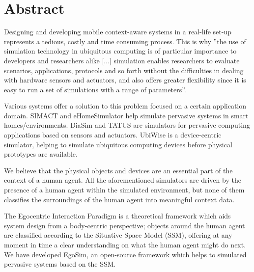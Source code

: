 \begingroup
\let\clearpage\relax
\let\cleardoublepage\relax
\let\cleardoublepage\relax

\chapter*{Abstract}
Designing and developing mobile context-aware systems in a real-life set-up represents a tedious, costly and time consuming process. This is why ''the use of simulation technology in ubiquitous computing is of particular importance to developers and researchers alike [...] simulation enables researchers to evaluate scenarios, applications, protocols and so forth without the difficulties in dealing with hardware sensors and actuators, and also offers greater flexibility since it is easy to run a set of simulations with a range of parameters''\cite{reynolds2006requirements}.

Various systems offer a solution to this problem focused on a certain application domain. SIMACT \cite{bouchard2012simact} and eHomeSimulator \cite{armac2007simulation} help simulate pervasive systems in smart homes/environments. DiaSim \cite{bruneau2013diasim} and TATUS \cite{o2005testbed} are simulators for pervasive computing applications based on sensors and actuators. UbiWise \cite{barton2003ubiwise} is a device-centric simulator, helping to simulate ubiquitous computing devices before physical prototypes are available.

We believe that the physical objects and devices are an essential part of the context of a human agent. All the aforementioned simulators are driven by the presence of a human agent within the simulated environment, but none of them classifies the surroundings of the human agent into meaningful context data.
 
The Egocentric Interaction Paradigm is a theoretical framework which aids system design from a body-centric perspective; objects around the human agent are classified according to the Situative Space Model (SSM), offering at any moment in time a clear understanding on what the human agent might do next. We have developed EgoSim, an open-source framework which helps to simulated pervasive systems based on the SSM.

